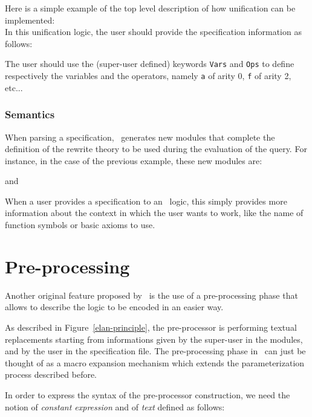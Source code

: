 \FEX

\EX \label{unif.lgi.example}
Here is a simple example of the top level description of how unification can 
be implemented:\\
\noindent
In this unification logic, the user should provide the specification
information as follows:\\

The user should use the (super-user defined) keywords {\tt Vars} and
{\tt Ops} to define respectively the variables and the operators,
namely {\tt a} of arity 0, {\tt f} of arity 2, etc...

\FEX

\subsubsection{Semantics}

When parsing a specification, \elan\ generates new modules that
 complete the definition of the rewrite theory to be used during the
 evaluation of the query. For instance, in the case of the previous
 example, these new modules are:
\\

\noindent
and\\

When a user provides a specification to an \elan\ logic, this simply
provides more information about the context in which the user wants
to work, like the name of function symbols or basic axioms to use.

\section{Pre-processing}
\label{preprocessor}

Another original feature proposed by \elan\ is the use of a
pre-processing phase that allows to describe the logic to be encoded
in an easier way.

As described in Figure~\ref{elan-principle}, the pre-processor is
performing textual replacements starting from informations given by
the super-user in the modules, and by the user in the specification
file. The pre-processing phase in \elan\ can just be thought of as a
macro expansion mechanism which extends the parameterization process
described before.

In order to express the syntax of the pre-processor construction, we
need the notion of {\it constant expression} and of {\it text} defined
as follows:

